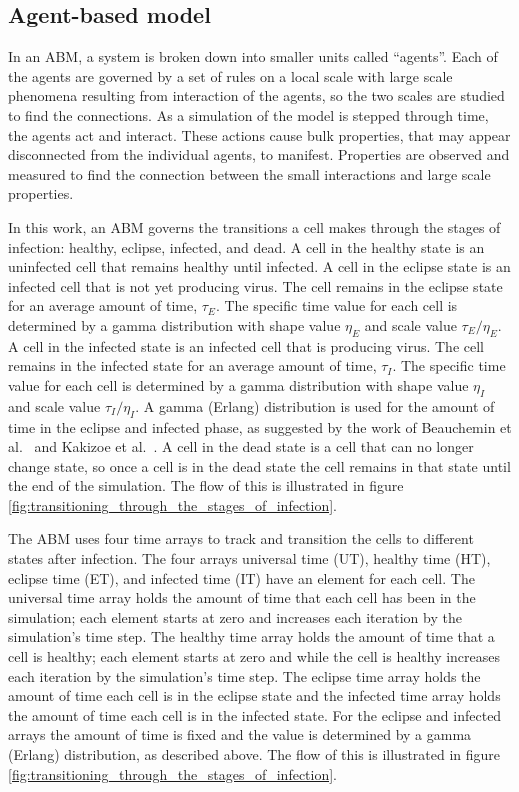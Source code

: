 \subsection{Agent-based model} \label{ABM}

In an ABM, a system is broken down into smaller units called ``agents''. Each of the agents are governed by a set of rules on a local scale with large scale phenomena resulting from interaction of the agents, so the two scales are studied to find the connections. As a simulation of the model is stepped through time, the agents act and interact. These actions cause bulk properties, that may appear disconnected from the individual agents, to manifest. Properties are observed and measured to find the connection between the small interactions and large scale properties.

In this work, an ABM governs the transitions a cell makes through the stages of infection: healthy, eclipse, infected, and dead. A cell in the healthy state is an uninfected cell that remains healthy until infected. A cell in the eclipse state is an infected cell that is not yet producing virus. The cell remains in the eclipse state for an average amount of time, $\tau_E$. The specific time value for each cell is determined by a gamma distribution with shape value $\eta_E$ and scale value $\tau_E/\eta_E$. A cell in the infected state is an infected cell that is producing virus. The cell remains in the infected state for an average amount of time, $\tau_I$. The specific time value for each cell is determined by a gamma distribution with shape value $\eta_I$ and scale value $\tau_I/\eta_I$. A gamma (Erlang) distribution is used for the amount of time in the eclipse and infected phase, as suggested by the work of Beauchemin et al.\ \citep{beauchemin17} and Kakizoe et al.\ \citep{kakizoe15}. A cell in the dead state is a cell that can no longer change state, so once a cell is in the dead state the cell remains in that state until the end of the simulation. The flow of this is illustrated in figure \ref{fig:transitioning_through_the_stages_of_infection}.

The ABM uses four time arrays to track and transition the cells to different states after infection. The four arrays universal time (UT), healthy time (HT), eclipse time (ET), and infected time (IT) have an element for each cell. The universal time array holds the amount of time that each cell has been in the simulation; each element starts at zero and increases each iteration by the simulation's time step. The healthy time array holds the amount of time that a cell is healthy; each element starts at zero and while the cell is healthy increases each iteration by the simulation's time step. The eclipse time array holds the amount of time each cell is in the eclipse state and the infected time array holds the amount of time each cell is in the infected state. For the eclipse and infected arrays the amount of time is fixed and the value is determined by a gamma (Erlang) distribution, as described above. The flow of this is illustrated in figure \ref{fig:transitioning_through_the_stages_of_infection}.

